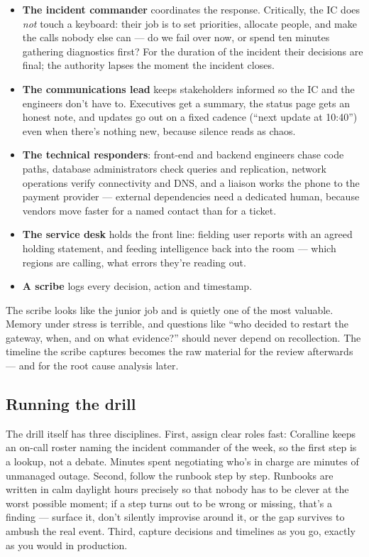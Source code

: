 \begin{itemize}[leftmargin=*]
\item \textbf{The incident commander} coordinates the response. Critically, the IC does \emph{not} touch a keyboard: their job is to set priorities, allocate people, and make the calls nobody else can — do we fail over now, or spend ten minutes gathering diagnostics first? For the duration of the incident their decisions are final; the authority lapses the moment the incident closes.
\item \textbf{The communications lead} keeps stakeholders informed so the IC and the engineers don't have to. Executives get a summary, the status page gets an honest note, and updates go out on a fixed cadence (``next update at 10:40'') even when there's nothing new, because silence reads as chaos.
\item \textbf{The technical responders}: front-end and backend engineers chase code paths, database administrators check queries and replication, network operations verify connectivity and DNS, and a liaison works the phone to the payment provider — external dependencies need a dedicated human, because vendors move faster for a named contact than for a ticket.
\item \textbf{The service desk} holds the front line: fielding user reports with an agreed holding statement, and feeding intelligence back into the room — which regions are calling, what errors they're reading out.
\item \textbf{A scribe} logs every decision, action and timestamp.
\end{itemize}

The scribe looks like the junior job and is quietly one of the most valuable. Memory under stress is terrible, and questions like ``who decided to restart the gateway, when, and on what evidence?'' should never depend on recollection. The timeline the scribe captures becomes the raw material for the review afterwards — and for the root cause analysis later.



\subsection{Running the drill}


The drill itself has three disciplines. First, assign clear roles fast: Coralline keeps an on-call roster naming the incident commander of the week, so the first step is a lookup, not a debate. Minutes spent negotiating who's in charge are minutes of unmanaged outage. Second, follow the runbook step by step. Runbooks are written in calm daylight hours precisely so that nobody has to be clever at the worst possible moment; if a step turns out to be wrong or missing, that's a finding — surface it, don't silently improvise around it, or the gap survives to ambush the real event. Third, capture decisions and timelines as you go, exactly as you would in production.


